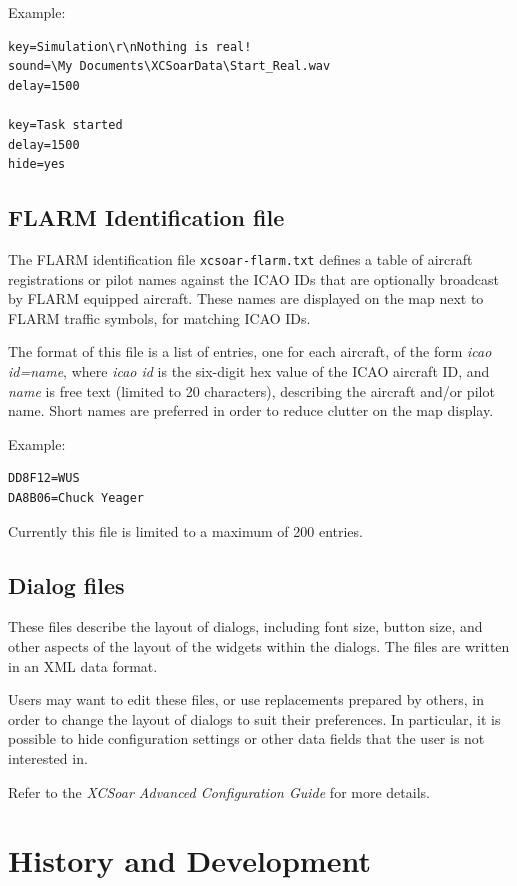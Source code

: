 \documentclass[a4paper,12pt]{refrep}
\begin{document}
Example:
\begin{verbatim}
key=Simulation\r\nNothing is real!
sound=\My Documents\XCSoarData\Start_Real.wav
delay=1500

key=Task started
delay=1500
hide=yes
\end{verbatim}
% 

\section{FLARM Identification file}\label{sec:flarm-ident-file}

The FLARM identification file \verb|xcsoar-flarm.txt| defines a table
of aircraft registrations or pilot names against the ICAO IDs that are
optionally broadcast by FLARM equipped aircraft.  These names are
displayed on the map next to FLARM traffic symbols, for matching ICAO
IDs.

The format of this file is a list of entries, one for each aircraft,
of the form {\em icao id=name}, where {\em icao id} is the six-digit
hex value of the ICAO aircraft ID, and {\em name} is free text
(limited to 20 characters), describing the aircraft and/or pilot name.
Short names are preferred in order to reduce clutter on the map
display.

Example:
\begin{verbatim}
DD8F12=WUS
DA8B06=Chuck Yeager
\end{verbatim}

Currently this file is limited to a maximum of 200 entries.

\section{Dialog files}\label{sec:dialog-files}

These files describe the layout of dialogs, including font size,
button size, and other aspects of the layout of the widgets within
the dialogs.  The files are written in an XML data format.

Users may want to edit these files, or use replacements prepared by
others, in order to change the layout of dialogs to suit their
preferences.  In particular, it is possible to hide configuration
settings or other data fields that the user is not interested in.

Refer to the {\em XCSoar Advanced Configuration Guide} for more details.

\chapter{History and Development}\label{cha:history-development}
\end{document}
